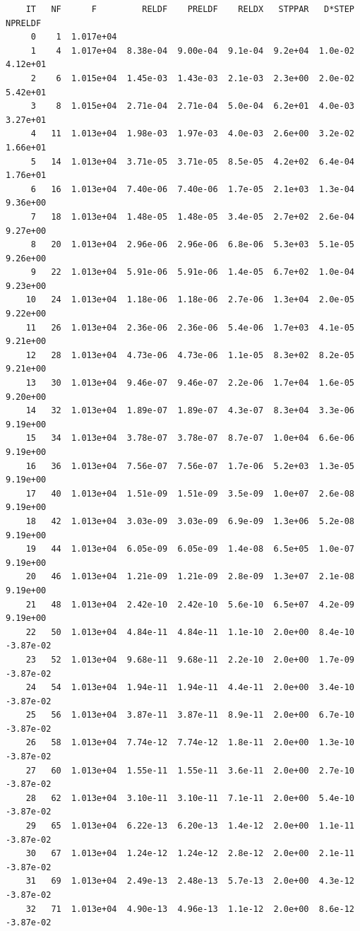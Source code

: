 \documentclass[11pt]{article}\usepackage[]{graphicx}\usepackage[]{color}
\makeatletter
\newenvironment{kframe}{%
 \def\at@end@of@kframe{}%
 \ifinner\ifhmode%
  \def\at@end@of@kframe{\end{minipage}}%
  \begin{minipage}{\columnwidth}%
 \fi\fi%
 \def\FrameCommand##1{\hskip\@totalleftmargin \hskip-\fboxsep
 \colorbox{shadecolor}{##1}\hskip-\fboxsep
     \hskip-\linewidth \hskip-\@totalleftmargin \hskip\columnwidth}%
 \MakeFramed {\advance\hsize-\width
   \@totalleftmargin\z@ \linewidth\hsize
   \@setminipage}}%
 {\par\unskip\endMakeFramed%
 \at@end@of@kframe}
\newenvironment{knitrout}{}{} %
\makeatother
\begin{document}
\begin{knitrout}
\begin{kframe}
\begin{verbatim}
    IT   NF      F         RELDF    PRELDF    RELDX   STPPAR   D*STEP   NPRELDF
     0    1  1.017e+04
     1    4  1.017e+04  8.38e-04  9.00e-04  9.1e-04  9.2e+04  1.0e-02  4.12e+01
     2    6  1.015e+04  1.45e-03  1.43e-03  2.1e-03  2.3e+00  2.0e-02  5.42e+01
     3    8  1.015e+04  2.71e-04  2.71e-04  5.0e-04  6.2e+01  4.0e-03  3.27e+01
     4   11  1.013e+04  1.98e-03  1.97e-03  4.0e-03  2.6e+00  3.2e-02  1.66e+01
     5   14  1.013e+04  3.71e-05  3.71e-05  8.5e-05  4.2e+02  6.4e-04  1.76e+01
     6   16  1.013e+04  7.40e-06  7.40e-06  1.7e-05  2.1e+03  1.3e-04  9.36e+00
     7   18  1.013e+04  1.48e-05  1.48e-05  3.4e-05  2.7e+02  2.6e-04  9.27e+00
     8   20  1.013e+04  2.96e-06  2.96e-06  6.8e-06  5.3e+03  5.1e-05  9.26e+00
     9   22  1.013e+04  5.91e-06  5.91e-06  1.4e-05  6.7e+02  1.0e-04  9.23e+00
    10   24  1.013e+04  1.18e-06  1.18e-06  2.7e-06  1.3e+04  2.0e-05  9.22e+00
    11   26  1.013e+04  2.36e-06  2.36e-06  5.4e-06  1.7e+03  4.1e-05  9.21e+00
    12   28  1.013e+04  4.73e-06  4.73e-06  1.1e-05  8.3e+02  8.2e-05  9.21e+00
    13   30  1.013e+04  9.46e-07  9.46e-07  2.2e-06  1.7e+04  1.6e-05  9.20e+00
    14   32  1.013e+04  1.89e-07  1.89e-07  4.3e-07  8.3e+04  3.3e-06  9.19e+00
    15   34  1.013e+04  3.78e-07  3.78e-07  8.7e-07  1.0e+04  6.6e-06  9.19e+00
    16   36  1.013e+04  7.56e-07  7.56e-07  1.7e-06  5.2e+03  1.3e-05  9.19e+00
    17   40  1.013e+04  1.51e-09  1.51e-09  3.5e-09  1.0e+07  2.6e-08  9.19e+00
    18   42  1.013e+04  3.03e-09  3.03e-09  6.9e-09  1.3e+06  5.2e-08  9.19e+00
    19   44  1.013e+04  6.05e-09  6.05e-09  1.4e-08  6.5e+05  1.0e-07  9.19e+00
    20   46  1.013e+04  1.21e-09  1.21e-09  2.8e-09  1.3e+07  2.1e-08  9.19e+00
    21   48  1.013e+04  2.42e-10  2.42e-10  5.6e-10  6.5e+07  4.2e-09  9.19e+00
    22   50  1.013e+04  4.84e-11  4.84e-11  1.1e-10  2.0e+00  8.4e-10 -3.87e-02
    23   52  1.013e+04  9.68e-11  9.68e-11  2.2e-10  2.0e+00  1.7e-09 -3.87e-02
    24   54  1.013e+04  1.94e-11  1.94e-11  4.4e-11  2.0e+00  3.4e-10 -3.87e-02
    25   56  1.013e+04  3.87e-11  3.87e-11  8.9e-11  2.0e+00  6.7e-10 -3.87e-02
    26   58  1.013e+04  7.74e-12  7.74e-12  1.8e-11  2.0e+00  1.3e-10 -3.87e-02
    27   60  1.013e+04  1.55e-11  1.55e-11  3.6e-11  2.0e+00  2.7e-10 -3.87e-02
    28   62  1.013e+04  3.10e-11  3.10e-11  7.1e-11  2.0e+00  5.4e-10 -3.87e-02
    29   65  1.013e+04  6.22e-13  6.20e-13  1.4e-12  2.0e+00  1.1e-11 -3.87e-02
    30   67  1.013e+04  1.24e-12  1.24e-12  2.8e-12  2.0e+00  2.1e-11 -3.87e-02
    31   69  1.013e+04  2.49e-13  2.48e-13  5.7e-13  2.0e+00  4.3e-12 -3.87e-02
    32   71  1.013e+04  4.90e-13  4.96e-13  1.1e-12  2.0e+00  8.6e-12 -3.87e-02

\end{verbatim}
\end{kframe}
\end{knitrout}
\end{document}
